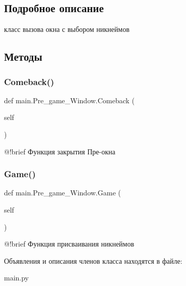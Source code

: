 \subsection{Подробное описание}
класс вызова окна с выбором никнеймов 

\subsection{Методы}
\mbox{\label{classmain_1_1_pre__game___window_a8936d10f0ec432afcffe29f114de465d}} 
\subsubsection{\texorpdfstring{Comeback()}{Comeback()}}
{\footnotesize\ttfamily def main.\+Pre\+\_\+game\+\_\+\+Window.\+Comeback (\begin{DoxyParamCaption}\item[{}]{self }\end{DoxyParamCaption})}

\begin{DoxyVerb}@!brief Функция закрытия Пре-окна
\end{DoxyVerb}
 \mbox{\label{classmain_1_1_pre__game___window_a089a4d758503837996424fb9a49518c8}} 
\subsubsection{\texorpdfstring{Game()}{Game()}}
{\footnotesize\ttfamily def main.\+Pre\+\_\+game\+\_\+\+Window.\+Game (\begin{DoxyParamCaption}\item[{}]{self }\end{DoxyParamCaption})}

\begin{DoxyVerb}@!brief Функция присваивания никнеймов
\end{DoxyVerb}
 

Объявления и описания членов класса находятся в файле\+:\begin{DoxyCompactItemize}
\item 
main.\+py\end{DoxyCompactItemize}
